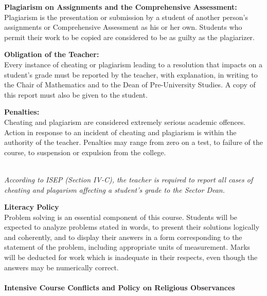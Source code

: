 \documentclass[10pt]{article}
\begin{document}
\begin{multicols}{2}
\textbf{Plagiarism on Assignments and the Comprehensive Assessment:}\\
Plagiarism is the presentation or submission by a student of
another person's assignments or Comprehensive Assessment as his or
her own. Students who permit their work to be copied are considered
to be as guilty as the plagiarizer.\\\vspace{-0.1in}

\textbf{Obligation of the Teacher:}\\
Every instance of cheating or plagiarism leading to a resolution
that impacts on a student's grade must be reported by the teacher,
with explanation, in writing to the Chair of Mathematics and to the
Dean of Pre-University Studies. A copy of this report must also be
given to the student.\\\vspace{-0.1in}

\textbf{Penalties:}\\
Cheating and plagiarism are considered extremely serious academic
offences. Action in response to an incident of cheating and
plagiarism is within the authority of the teacher.
Penalties may range from zero on a test, to failure of the
course, to suspension or expulsion from the college.\\ \\ \vspace{-0.1in}

\textit{According to ISEP (Section IV-C), the teacher is required to report all cases of cheating and plagarism affecting a student's grade to the Sector Dean.}
\vfill
\columnbreak

\large{\textbf{Literacy Policy}}\\
\vspace{-0.15in}\hline \bigskip \normalsize
Problem solving is an essential component of this course.  Students will be expected to analyze problems stated in words, to present their solutions logically and coherently, and to display their answers in a form corresponding to the statement of the problem, including appropriate units of measurement.  Marks will be deducted for work which is inadequate in their respects, even though the answers may be numerically correct. \\ \\


\large\textbf{Intensive Course Conflicts and Policy on Religious Observances}\\
\vspace{-0.15in}\hline \bigskip \normalsize


\end{multicols}
\end{document}

